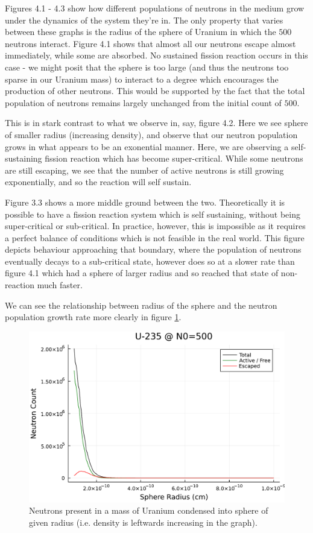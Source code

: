 Figures 4.1 - 4.3 show how different populations of neutrons in the medium grow under the dynamics of the system they're in. The only 
property that varies between these graphs is the radius of the sphere of Uranium in which the $500$ neutrons interact. Figure 
4.1 shows that almost all our neutrons escape almost immediately, while some are absorbed. No sustained fission reaction 
occurs in this case - we might posit that the sphere is too large (and thus the neutrons too sparse in our Uranium mass) to 
interact to a degree which encourages the production of other neutrons. This would be supported by the fact that the total population 
of neutrons remains largely unchanged from the initial count of $500$. 

This is in stark contrast to what we observe in, say, figure 4.2. Here we see sphere of smaller radius (increasing density),
and observe that our neutron population grows in what appears to be an exonential manner. Here, we are observing a self-sustaining 
fission reaction which has become super-critical. While some neutrons are still escaping, we see that the number of active neutrons 
is still growing exponentially, and so the reaction will self sustain. 

Figure 3.3 shows a more middle ground between the two. Theoretically it is possible to have a fission reaction system which is self sustaining,
without being super-critical or sub-critical. In practice, however, this is impossible as it requires a perfect balance of conditions which 
is not feasible in the real world. This figure depicts behaviour approaching that boundary, where the population of neutrons eventually decays 
to a sub-critical state, however does so at a slower rate than figure 4.1 which had a sphere of larger radius and so reached that state of 
non-reaction much faster.

We can see the relationship between radius of the sphere and the neutron population growth rate more clearly in figure \ref{uranium-total}. 

\begin{figure}[h!]
    \centering
    \includegraphics[scale=0.7]{imgs/radius-variation-uranium.pdf}
    \caption{Neutrons present in a mass of Uranium condensed into sphere of given radius (i.e. density is leftwards increasing in 
    the graph).}
    \label{uranium-total}
\end{figure}

